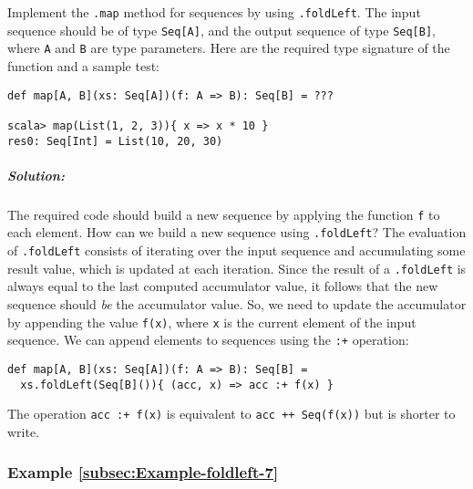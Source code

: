 Implement the \lstinline!.map!
method for sequences by using \lstinline!.foldLeft!.
The input sequence should be of type \lstinline!Seq[A]!,
and the output sequence of type \lstinline!Seq[B]!,
where \lstinline!A! and
\lstinline!B! are type
parameters. Here are the required type signature of the function and
a sample test:
\begin{lstlisting}
def map[A, B](xs: Seq[A])(f: A => B): Seq[B] = ???

scala> map(List(1, 2, 3)){ x => x * 10 }
res0: Seq[Int] = List(10, 20, 30)
\end{lstlisting}

\subparagraph{Solution:}

The required code should build a new sequence by applying the function
\lstinline!f! to each element.
How can we build a new sequence using \lstinline!.foldLeft!?
The evaluation of \lstinline!.foldLeft!
consists of iterating over the input sequence and accumulating some
result value, which is updated at each iteration. Since the result
of a \lstinline!.foldLeft!
is always equal to the last computed accumulator value, it follows
that the new sequence should \emph{be} the accumulator value. So,
we need to update the accumulator by appending the value \lstinline!f(x)!,
where \lstinline!x! is
the current element of the input sequence. We can append elements
to sequences using the \lstinline!:+!
operation:
\begin{lstlisting}
def map[A, B](xs: Seq[A])(f: A => B): Seq[B] =
  xs.foldLeft(Seq[B]()){ (acc, x) => acc :+ f(x) }
\end{lstlisting}
The operation \lstinline!acc :+ f(x)!
is equivalent to \lstinline!acc ++ Seq(f(x))!
but is shorter to write.

\subsubsection{Example \label{subsec:Example-foldleft-7}\ref{subsec:Example-foldleft-7}}

